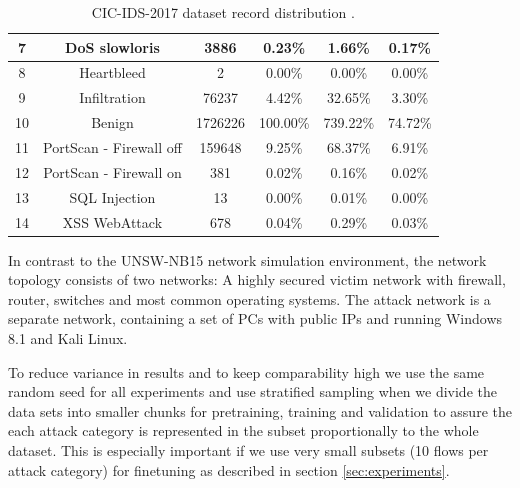 \begin{table}[H]
\begin{tabular}{cccccc}
		7  & DoS slowloris           & 3886        & 0.23\%                 & 1.66\%                          & 0.17\%                    \\ \midrule
		8  & Heartbleed              & 2           & 0.00\%                 & 0.00\%                          & 0.00\%                    \\ \midrule
		9  & Infiltration            & 76237       & 4.42\%                 & 32.65\%                         & 3.30\%                    \\ \midrule
		10 & Benign                  & 1726226     & 100.00\%               & 739.22\%                        & 74.72\%                   \\ \midrule
		11 & PortScan - Firewall off & 159648      & 9.25\%                 & 68.37\%                         & 6.91\%                    \\ \midrule
		12 & PortScan - Firewall on  & 381         & 0.02\%                 & 0.16\%                          & 0.02\%                    \\ \midrule
		13 & SQL Injection           & 13          & 0.00\%                 & 0.01\%                          & 0.00\%                    \\ \midrule
		14 & XSS WebAttack           & 678         & 0.04\%                 & 0.29\%                          & 0.03\%                   
	\end{tabular}
	\caption{CIC-IDS-2017 dataset record distribution \cite{cic_ids_2017_analysis}.}
	\label{table:methodology:datasets:cic_ids_2017_categories}
\end{table}

In contrast to the UNSW-NB15 network simulation environment, the network topology consists of two networks: A highly secured victim network with firewall, router, switches and most common operating systems. The attack network is a separate network, containing a set of PCs with public IPs and running Windows 8.1 and Kali Linux.

To reduce variance in results and to keep comparability high we use the same random seed for all experiments and use stratified sampling when we divide the data sets into smaller chunks for pretraining, training and validation to assure the each attack category is represented in the subset proportionally to the whole dataset. This is especially important if we use very small subsets (10 flows per attack category) for finetuning as described in section \ref{sec:experiments}. 

